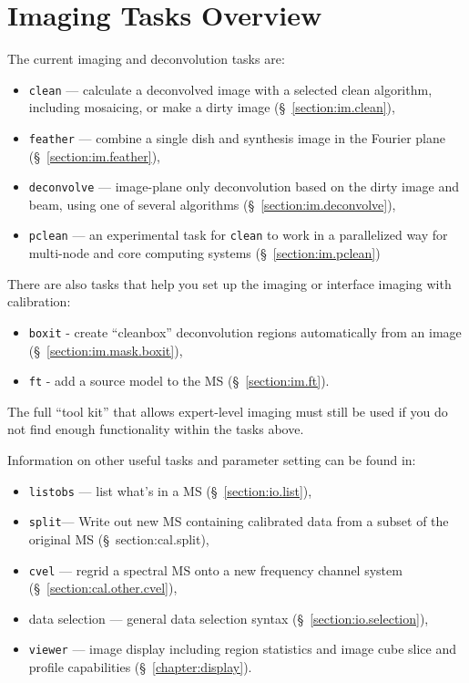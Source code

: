 \section{Imaging Tasks Overview}
\label{section:im.tasks}

The current imaging and deconvolution tasks are:
\begin{itemize}
   \item {\tt clean} --- calculate a deconvolved image with a selected clean
         algorithm, including mosaicing, or make a dirty image
         (\S~\ref{section:im.clean}),
   \item {\tt feather} --- combine a single dish and synthesis image in the
         Fourier plane (\S~\ref{section:im.feather}),
   \item {\tt deconvolve} --- image-plane only deconvolution based on
         the dirty image and beam, using one of several algorithms
         (\S~\ref{section:im.deconvolve}),
   \item {\tt pclean} --- an experimental task for {\tt clean} to work
     in a parallelized way for multi-node and core computing systems
          (\S~\ref{section:im.pclean})
\end{itemize}

There are also tasks that help you set up the imaging or interface
imaging with calibration:

\begin{itemize}
   \item {\tt boxit} - create ``cleanbox'' deconvolution regions automatically
         from an image
	 (\S~\ref{section:im.mask.boxit}),
   \item {\tt ft} - add a source model to the MS (\S~\ref{section:im.ft}).
\end{itemize}

The full ``tool kit'' that allows expert-level imaging must still be
used if you do not find enough functionality within the tasks above. 

Information on other useful tasks and parameter setting can be found in:
\begin{itemize}
   \item {\tt listobs} --- list what's in a MS (\S~\ref{section:io.list}),
   \item {\tt split}--- Write out new MS containing calibrated data
      from a subset of the original MS (\S~{section:cal.split}),
   \item {\tt cvel} --- regrid a spectral MS onto a new frequency
      channel system
      (\S~\ref{section:cal.other.cvel}),
   \item data selection --- general data selection syntax
      (\S~\ref{section:io.selection}),
   \item {\tt viewer} --- image display including region statistics and
         image cube slice and profile capabilities
         (\S~\ref{chapter:display}).
\end{itemize}

